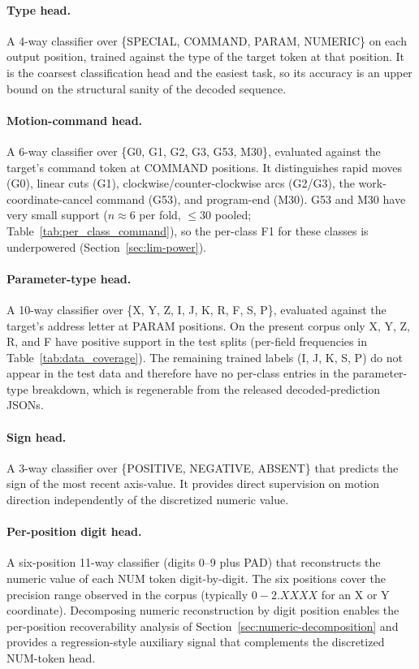 \documentclass[sensors,article,submit,moreauthors,pdftex]{Definitions/mdpi}
\begin{document}
\paragraph{Type head.} A 4-way classifier over \{SPECIAL, COMMAND, PARAM, NUMERIC\} on each output position, trained against the type of the target token at that position. It is the coarsest classification head and the easiest task, so its accuracy is an upper bound on the structural sanity of the decoded sequence.

\paragraph{Motion-command head.} A 6-way classifier over \{G0, G1, G2, G3, G53, M30\}, evaluated against the target's command token at COMMAND positions. It distinguishes rapid moves (G0), linear cuts (G1), clockwise/counter-clockwise arcs (G2/G3), the work-coordinate-cancel command (G53), and program-end (M30). G53 and M30 have very small support ($n\!\approx\!6$ per fold, $\le\!30$ pooled; Table~\ref{tab:per_class_command}), so the per-class F1 for these classes is underpowered (Section~\ref{sec:lim-power}).

\paragraph{Parameter-type head.} A 10-way classifier over \{X, Y, Z, I, J, K, R, F, S, P\}, evaluated against the target's address letter at PARAM positions. On the present corpus only X, Y, Z, R, and F have positive support in the test splits (per-field frequencies in Table~\ref{tab:data_coverage}). The remaining trained labels (I, J, K, S, P) do not appear in the test data and therefore have no per-class entries in the parameter-type breakdown, which is regenerable from the released decoded-prediction JSONs.

\paragraph{Sign head.} A 3-way classifier over \{POSITIVE, NEGATIVE, ABSENT\} that predicts the sign of the most recent axis-value. It provides direct supervision on motion direction independently of the discretized numeric value.

\paragraph{Per-position digit head.} A six-position 11-way classifier (digits 0--9 plus PAD) that reconstructs the numeric value of each NUM token digit-by-digit. The six positions cover the precision range observed in the corpus (typically $0\!-\!2\!.X\!X\!X\!X$ for an X or Y coordinate). Decomposing numeric reconstruction by digit position enables the per-position recoverability analysis of Section~\ref{sec:numeric-decomposition} and provides a regression-style auxiliary signal that complements the discretized NUM-token head.
\end{document}
